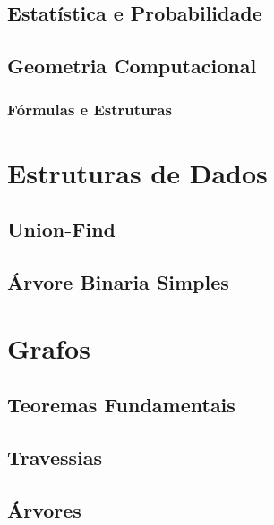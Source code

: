     \section{Estatística e Probabilidade}
        
        \newpage
        
        \newpage
    \section{Geometria Computacional}
        \subsection{Fórmulas e Estruturas}
            
            \newpage
        
\chapter{Estruturas de Dados}
    \section{Union-Find}
        
    \section{Árvore Binaria Simples}
        
        

% 

% 

\chapter{Grafos}
    \section{Teoremas Fundamentais}
        
        \newpage
    \section{Travessias}
        
        
        
        
        \newpage
    \section{Árvores}
        
        
        \newpage
